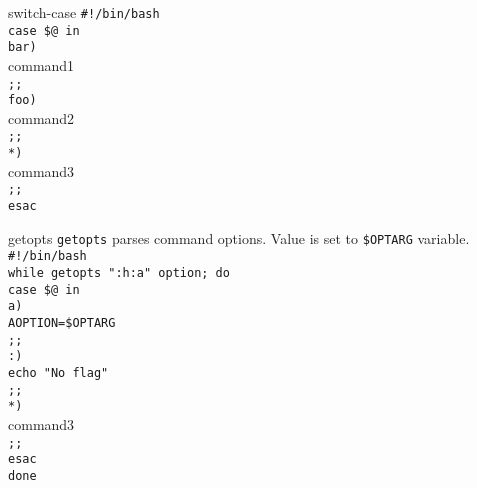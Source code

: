 \documentclass{beamer}
\let\tt\texttt
\begin{document}
\begin{frame}{switch-case}
        \tt{\#!/bin/bash}                       \\
        \tt{case \$@ in}                        \\
        \quad \tt{bar)}                         \\
        \quad \quad command1                    \\
        \quad \tt{;;}                           \\
        \quad \tt{foo)}                         \\
        \quad \quad command2                    \\
        \quad \tt{;;}                           \\
        \quad \tt{*)}                           \\
        \quad \quad command3                    \\
        \quad \tt{;;}                           \\
        \tt{esac}                               \\
\end{frame}

\begin{frame}{getopts}
        \tt{getopts} parses command options. Value is set to \tt{\$OPTARG} variable. \\
        \tt{\#!/bin/bash}   \\
        \tt{while getopts ":h:a" option; do}        \\
        \quad \tt{case \$@ in}                      \\
        \quad \quad \tt{a)}                         \\
        \quad \quad \quad \tt{AOPTION=\$OPTARG}     \\
        \quad \quad \tt{;;}                         \\
        \quad \quad \tt{:)}                         \\
        \quad \quad \quad \tt{echo "No flag"}       \\
        \quad \quad \tt{;;}                         \\
        \quad \quad \tt{*)}                         \\
        \quad \quad \quad command3                  \\
        \quad \quad \tt{;;}                         \\
        \quad \tt{esac}                             \\
        \tt{done}                                   \\
\end{frame}
\end{document}
